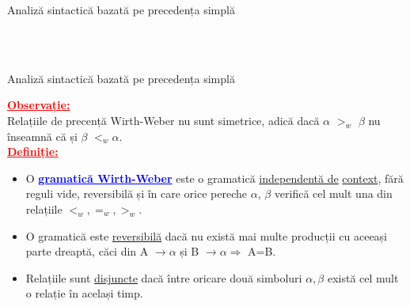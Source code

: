 \documentclass[pdf]{beamer}
\begin{document}
\begin{frame}{Analiză sintactică bazată pe precedența simplă}

\begin{center}
\textcolor{white}{fill}\\
\textcolor{white}{fill}\\

\end{center}
\end{frame}



\begin{frame}{Analiză sintactică bazată pe precedența simplă}

\textcolor{red}{\underline{\textbf{Observație:}}}\\
{\small Relațiile de precență Wirth-Weber nu sunt simetrice, adică dacă $\alpha$ $>_{w}$ $\beta$ nu înseamnă că și $\beta$ $<_{w} \alpha .$}\\

\textcolor{red}{\underline{\textbf{Definiție:}}}\\

\begin{itemize}
 \item {\small O \textcolor{blue}{\underline{\textbf{gramatică Wirth-Weber}}} este o gramatică \underline{independentă de} \underline{ context}, fără reguli vide, reversibilă și în care orice pereche $\alpha$, $\beta$ verifică cel mult una din relațiile $<_w, =_w, >_w$.}
 
 \item {\small O gramatică este \underline{reversibilă} dacă nu există mai multe producții cu aceeași parte dreaptă, căci din A $\rightarrow \alpha$ și B $\rightarrow \alpha \Rightarrow$ A=B.}
 \item {\small Relațiile sunt \underline{disjuncte} dacă între oricare două simboluri $\alpha, \beta$ există cel mult o relație în același timp.}

\end{itemize}
\end{frame}
\end{document}
